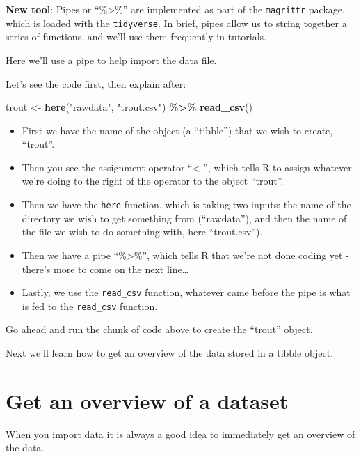 \documentclass[
]{book}
\newenvironment{Shaded}{\begin{snugshade}}{\end{snugshade}}
\newcommand{\FunctionTok}[1]{\textcolor[rgb]{0.13,0.29,0.53}{\textbf{#1}}}
\newcommand{\NormalTok}[1]{#1}
\newcommand{\OtherTok}[1]{\textcolor[rgb]{0.56,0.35,0.01}{#1}}
\newcommand{\SpecialCharTok}[1]{\textcolor[rgb]{0.81,0.36,0.00}{\textbf{#1}}}
\newcommand{\StringTok}[1]{\textcolor[rgb]{0.31,0.60,0.02}{#1}}
\providecommand{\tightlist}{%
  \setlength{\itemsep}{0pt}\setlength{\parskip}{0pt}}
\begin{document}
\textbf{New tool}: Pipes or ``\%\textgreater\%'' are implemented as part of the \texttt{magrittr} package, which is loaded with the \texttt{tidyverse}. In brief, pipes allow us to string together a series of functions, and we'll use them frequently in tutorials.

Here we'll use a pipe to help import the data file.

Let's see the code first, then explain after:

\begin{Shaded}
\begin{Highlighting}[]
\NormalTok{trout }\OtherTok{\textless{}{-}} \FunctionTok{here}\NormalTok{(}\StringTok{"rawdata"}\NormalTok{, }\StringTok{"trout.csv"}\NormalTok{) }\SpecialCharTok{\%\textgreater{}\%}
  \FunctionTok{read\_csv}\NormalTok{()}
\end{Highlighting}
\end{Shaded}

\begin{itemize}
\tightlist
\item
  First we have the name of the object (a ``tibble'') that we wish to create, ``trout''.
\item
  Then you see the assignment operator ``\textless-'', which tells R to assign whatever we're doing to the right of the operator to the object ``trout''.
\item
  Then we have the \texttt{here} function, which is taking two inputs: the name of the directory we wish to get something from (``rawdata''), and then the name of the file we wish to do something with, here ``trout.csv'').
\item
  Then we have a pipe ``\%\textgreater\%'', which tells R that we're not done coding yet - there's more to come on the next line\ldots{}
\item
  Lastly, we use the \texttt{read\_csv} function, whatever came before the pipe is what is fed to the \texttt{read\_csv} function.
\end{itemize}

Go ahead and run the chunk of code above to create the ``trout'' object.

Next we'll learn how to get an overview of the data stored in a tibble object.

\section{Get an overview of a dataset}\label{data_overview}

When you import data it is always a good idea to immediately get an overview of the data.
\end{document}

